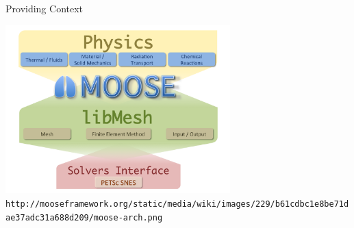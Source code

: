\begin{frame}{Providing Context}

 \begin{center}
  \includegraphics[width=0.65\textwidth]{figures/moose-arch} \\
  {\scriptsize \texttt{http://mooseframework.org/static/media/wiki/images/229/b61cdbc1e8be71dae37adc31a688d209/moose-arch.png}}
 \end{center}

\end{frame}



